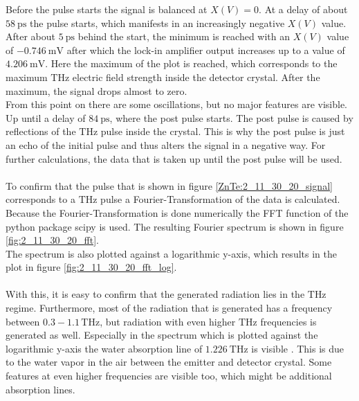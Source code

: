 \FloatBarrier
Before the pulse starts the signal is balanced at $X(V)=0$.
At a delay of about $\SI{58}{\pico\second}$ the pulse starts, which manifests in an increasingly negative $X(V)$ value.
After about $\SI{5}{\pico\second}$ behind the start, the minimum is reached with an $X(V)$ value of $\SI{-0.746}{\milli\V}$ after which the lock-in amplifier output increases up to a value of $\SI{4.206}{\milli\V}$.
Here the maximum of the plot is reached, which corresponds to the maximum $\si{\tera\hertz}$ electric field strength inside the detector crystal.
After the maximum, the signal drops almost to zero.
\\
From this point on there are some oscillations, but no major features are visible. %
Up until a delay of $\SI{84}{\pico\second}$, where the post pulse starts.
The post pulse is caused by reflections of the $\si{\tera\hertz}$ pulse inside the crystal.
This is why the post pulse is just an echo of the initial pulse and thus alters the signal in a negative way.
For further calculations, the data that is taken up until the post pulse will be used.
\\\\
To confirm that the pulse that is shown in figure \ref{ZnTe:2_11_30_20_signal} corresponds to a $\si{\tera\hertz}$ pulse a Fourier-Transformation of the data is calculated. %
Because the Fourier-Transformation is done numerically the FFT function of the python package scipy \cite{scipy} is used.
The resulting Fourier spectrum is shown in figure \ref{fig:2_11_30_20_fft}.
\\
The spectrum is also plotted against a logarithmic y-axis, which results in the plot in figure \ref{fig:2_11_30_20_fft_log}.
\\\\
With this, it is easy to confirm that the generated radiation lies in the $\si{\tera\hertz}$ regime.
Furthermore, most of the radiation that is generated has a frequency between $0.3-1.1\,\si{\tera\hertz}$, but radiation with even higher $\si{\tera\hertz}$ frequencies is generated as well.
Especially in the spectrum which is plotted against the logarithmic y-axis the water absorption line of $\SI{1.226}{\tera\hertz}$ is visible \cite{water_absorption}.
This is due to the water vapor in the air between the emitter and detector crystal.
Some features at even higher frequencies are visible too, which might be additional absorption lines.
